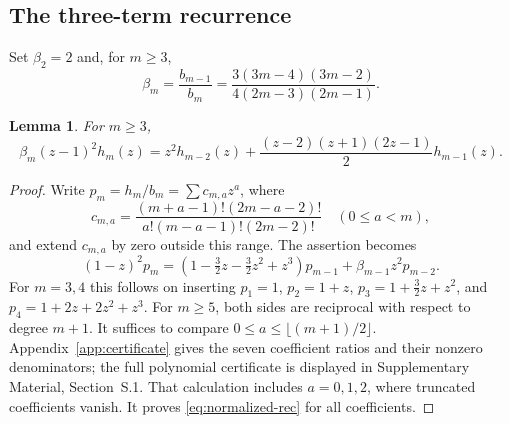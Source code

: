 \documentclass[11pt,a4paper]{amsart}
\newtheorem{lemma}[theorem]{Lemma}
\theoremstyle{remark}\newtheorem{remark}[theorem]{Remark}
\numberwithin{equation}{section}
\begin{document}
\subsection{The three-term recurrence}
Set $\beta_2=2$ and, for $m\ge3$,
\[
 \beta_m=\frac{b_{m-1}}{b_m}
 =\frac{3(3m-4)(3m-2)}{4(2m-3)(2m-1)}.
\]
\begin{lemma}\label{lem:recurrence}
For $m\ge3$,
\begin{equation}\label{eq:recurrence}
 \beta_m(z-1)^2h_m(z)=z^2h_{m-2}(z)
 +\frac{(z-2)(z+1)(2z-1)}2h_{m-1}(z).
\end{equation}
\end{lemma}
\begin{proof}
Write $p_m=h_m/b_m=\sum c_{m,a}z^a$, where
\[
 c_{m,a}=\frac{(m+a-1)!(2m-a-2)!}{a!(m-a-1)!(2m-2)!}\quad(0\le a<m),
\]
and extend $c_{m,a}$ by zero outside this range. The assertion becomes
\begin{equation}\label{eq:normalized-rec}
 (1-z)^2p_m=(1-\tfrac32z-\tfrac32z^2+z^3)p_{m-1}
 +\beta_{m-1}z^2p_{m-2}.
\end{equation}
For $m=3,4$ this follows on inserting $p_1=1$, $p_2=1+z$, $p_3=1+\frac32z+z^2$, and $p_4=1+2z+2z^2+z^3$. For $m\ge5$, both sides are reciprocal with respect to degree $m+1$. It suffices to compare $0\le a\le\lfloor(m+1)/2\rfloor$. Appendix~\ref{app:certificate} gives the seven coefficient ratios and their nonzero denominators; the full polynomial certificate is displayed in Supplementary Material, Section~S.1. That calculation includes $a=0,1,2$, where truncated coefficients vanish. It proves \eqref{eq:normalized-rec} for all coefficients.
\end{proof}
\end{document}
